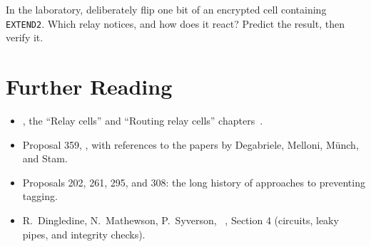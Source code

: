 \begin{esercizio}[3]\label{es:10-alterazione}
In the laboratory, deliberately flip one bit of an encrypted  cell containing \texttt{EXTEND2}. Which relay notices, and how does it react? Predict the result, then verify it.
\end{esercizio}

\section*{Further Reading}
\begin{itemize}
  \item {}, the \enquote{Relay cells} and \enquote{Routing relay cells} chapters~\cite{torspec}.
  \item Proposal 359, , with references to the papers by Degabriele, Melloni, Münch, and Stam.
  \item Proposals 202, 261, 295, and 308: the long history of approaches to preventing tagging.
  \item R.~Dingledine, N.~Mathewson, P.~Syverson, ~\cite{dingledine2004tor}, Section 4 (circuits, leaky pipes, and integrity checks).
\end{itemize}
